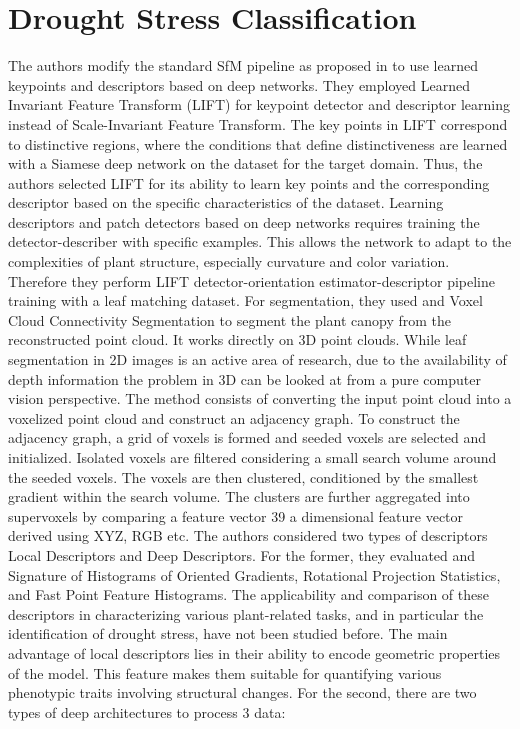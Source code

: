 \section{Drought Stress Classification}
The authors modify the standard SfM pipeline as proposed in to use learned keypoints and descriptors based on deep networks. They employed Learned Invariant Feature
Transform (LIFT) for keypoint detector and descriptor learning instead of Scale-Invariant Feature Transform. The key points in LIFT correspond to distinctive regions,
where the conditions that define distinctiveness are learned with a Siamese deep network on the dataset for the target domain. Thus, the authors selected LIFT for its
ability to learn key points and the corresponding descriptor based on the specific characteristics of the dataset. Learning descriptors and patch detectors based on deep
networks requires training the detector-describer with specific examples. This allows the network to adapt to the complexities of plant structure, especially curvature
and color variation. Therefore they perform LIFT detector-orientation estimator-descriptor pipeline training with a leaf matching dataset. For segmentation, they used
and Voxel Cloud Connectivity Segmentation to segment the plant canopy from the reconstructed point cloud. It works directly on 3D point clouds. While leaf segmentation
in 2D images is an active area of research, due to the availability of depth information the problem in 3D can be looked at from a pure computer vision perspective. The
method consists of converting the input point cloud into a voxelized point cloud and construct an adjacency graph. To construct the adjacency graph, a grid of voxels is
formed and seeded voxels are selected and initialized. Isolated voxels are filtered considering a small search volume around the seeded voxels. The voxels are then
clustered, conditioned by the smallest gradient within the search volume. The clusters are further aggregated into supervoxels by comparing a feature vector 39 a
dimensional feature vector derived using XYZ, RGB etc. The authors considered two types of descriptors Local Descriptors and Deep Descriptors. For the former,
they evaluated and Signature of Histograms of Oriented Gradients, Rotational Projection Statistics, and Fast Point Feature Histograms. The applicability and comparison
of these descriptors in characterizing various plant-related tasks, and in particular the identification of drought stress, have not been studied before.
The main advantage of local descriptors lies in their ability to encode geometric properties of the model. This feature makes them suitable for quantifying various
phenotypic traits involving structural changes. For the second, there are two types of deep architectures to process 3 data:

